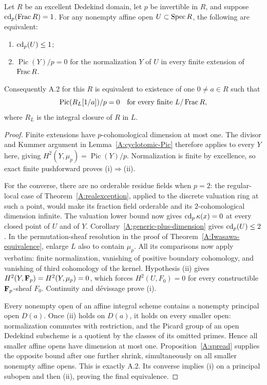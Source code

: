 \begin{corollary}
\label{A:Dedekind-Pic-criterion}
Let $R$ be an excellent Dedekind domain, let $p$ be invertible in $R$,
and suppose $\operatorname{cd}_p(\operatorname{Frac} R)=1$. For any nonempty affine open
$U\subset\operatorname{Spec} R$, the following are equivalent:
\begin{enumerate}[label=(\roman*)]
\item $\operatorname{cd}_p(U)\leq1$;
\item $\operatorname{Pic}(Y)/p=0$ for the normalization $Y$ of $U$
in every finite extension of $\operatorname{Frac} R$.
\end{enumerate}
Consequently A.2 for this $R$ is equivalent to existence of one
$0\ne a\in R$ such that
\[
 \operatorname{Pic}(R_L[1/a])/p=0
 \quad\hbox{for every finite }L/\operatorname{Frac} R,
\]
where $R_L$ is the integral closure of $R$ in $L$.
\end{corollary}
\begin{proof}
Finite extensions have $p$-cohomological dimension at most one.
The divisor and Kummer argument in Lemma~\ref{A:cyclotomic-Pic}
therefore applies to every $Y$ here, giving
$H^2(Y,\mu_p)=\operatorname{Pic}(Y)/p$.
Normalization is finite by excellence, so exact finite pushforward
proves (i)$\Rightarrow$(ii).

For the converse, there are no orderable residue fields when $p=2$:
the regular-local case of Theorem~\ref{A:realexception}, applied to
the discrete valuation ring at such a point, would make its fraction
field orderable and its $2$-cohomological dimension infinite.
The valuation lower bound now gives $\operatorname{cd}_p\kappa(x)=0$ at every
closed point of $U$ and of $Y$. Corollary~\ref{A:generic-plus-dimension}
gives $\operatorname{cd}_p(U)\leq2$. In the permutation-sheaf resolution in the
proof of Theorem~\ref{A:Iwasawa-equivalence}, enlarge $L$ also to
contain $\mu_p$. All its comparisons now apply verbatim: finite
normalization, vanishing of positive boundary cohomology, and
vanishing of third cohomology of the kernel. Hypothesis (ii) gives
$H^2(Y,\mathbf F_p)=H^2(Y,\mu_p)=0$, which forces $H^2(U,F_0)=0$
for every constructible $\mathbf F_p$-sheaf $F_0$. Continuity and
d\'evissage prove (i).

Every nonempty open of an affine integral scheme contains a nonempty
principal open $D(a)$. Once (ii) holds on $D(a)$, it holds on every
smaller open: normalization commutes with restriction, and the
Picard group of an open Dedekind subscheme is a quotient by the
classes of its omitted primes. Hence all smaller affine opens have
dimension at most one. Proposition~\ref{A:spread} supplies the
opposite bound after one further shrink, simultaneously on all
smaller nonempty affine opens. This is exactly A.2. Its converse
implies (i) on a principal subopen and then (ii), proving the final
equivalence.
\end{proof}

